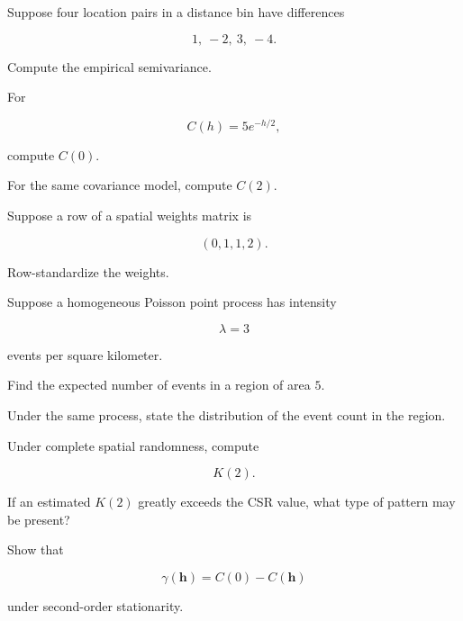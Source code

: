 \begin{exercise}[2]
Suppose four location pairs in a distance bin have differences

\[
1,\ -2,\ 3,\ -4.
\]

Compute the empirical semivariance.
\end{exercise}

\begin{exercise}[2]
For

\[
C(h)
=
5e^{-h/2},
\]

compute \(C(0)\).
\end{exercise}

\begin{exercise}[2]
For the same covariance model, compute \(C(2)\).
\end{exercise}

\begin{exercise}[2]
Suppose a row of a spatial weights matrix is

\[
(0,1,1,2).
\]

Row-standardize the weights.
\end{exercise}

\begin{exercise}[2]
Suppose a homogeneous Poisson point process has intensity

\[
\lambda=3
\]

events per square kilometer.

Find the expected number of events in a region of area \(5\).
\end{exercise}

\begin{exercise}[2]
Under the same process, state the distribution of the event count in the
region.
\end{exercise}

\begin{exercise}[2]
Under complete spatial randomness, compute

\[
K(2).
\]
\end{exercise}

\begin{exercise}[2]
If an estimated \(K(2)\) greatly exceeds the CSR value, what type of
pattern may be present?
\end{exercise}

\begin{exercise}[3]
Show that

\[
\gamma(\mathbf{h})
=
C(0)-C(\mathbf{h})
\]

under second-order stationarity.
\end{exercise}

